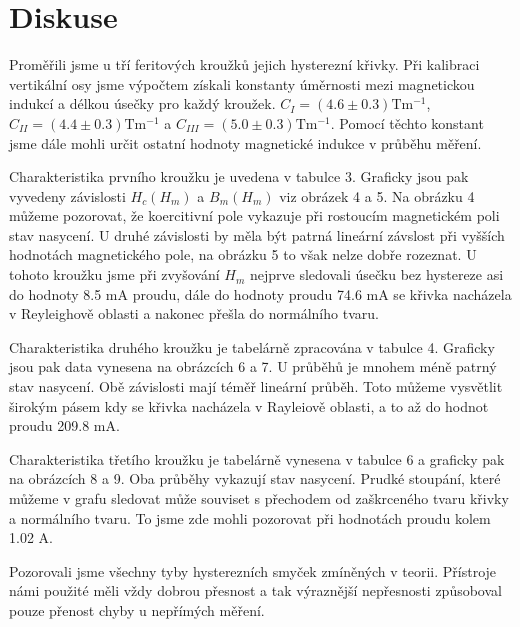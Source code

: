 \documentclass{article}
\begin{document}
\section{Diskuse}
\par  Proměřili jsme u tří feritových kroužků jejich hysterezní křivky. Při kalibraci vertikální osy jsme výpočtem získali konstanty úměrnosti mezi magnetickou indukcí a délkou úsečky pro každý kroužek. $C_{I} = (4.6 \pm 0.3)\mathrm{Tm^{-1}}$, $C_{II} = (4.4 \pm 0.3)\mathrm{Tm^{-1}}$ a $C_{III} = (5.0 \pm 0.3)\mathrm{Tm^{-1}}$. Pomocí těchto konstant jsme dále mohli určit ostatní hodnoty magnetické indukce v průběhu měření. 
\par Charakteristika prvního kroužku je uvedena v tabulce 3. Graficky jsou pak vyvedeny závislosti $H_c(H_m)$ a $B_m(H_m)$ viz obrázek 4 a 5. Na obrázku 4 můžeme pozorovat, že koercitivní pole vykazuje při rostoucím magnetickém poli stav nasycení. U druhé závislosti by měla být patrná lineární závslost při vyšších hodnotách magnetického pole, na obrázku 5 to však nelze dobře rozeznat. U tohoto kroužku jsme při zvyšování $H_m$ nejprve sledovali úsečku bez hystereze asi do hodnoty 8.5 mA proudu, dále do hodnoty proudu 74.6 mA se křivka nacházela v Reyleighově oblasti a nakonec přešla do normálního tvaru.
\par Charakteristika druhého kroužku je tabelárně zpracována v tabulce 4. Graficky jsou pak data vynesena na obrázcích 6 a 7. U průběhů je mnohem méně patrný stav nasycení. Obě závislosti mají téměř lineární průběh. Toto můžeme vysvětlit širokým pásem kdy se křivka nacházela v Rayleiově oblasti, a to až do hodnot proudu 209.8 mA. 
\par Charakteristika třetího kroužku je tabelárně vynesena v tabulce 6 a graficky pak na obrázcích 8 a 9. Oba průběhy vykazují stav nasycení. Prudké stoupání, které můžeme v grafu sledovat může souviset s přechodem od zaškrceného tvaru křivky a normálního tvaru. To jsme zde mohli pozorovat při hodnotách proudu kolem 1.02 A. 
\par Pozorovali jsme všechny tyby hysterezních smyček zmíněných v teorii. Přístroje námi použité měli vždy dobrou přesnost a tak výraznější nepřesnosti způsoboval pouze přenost chyby u nepřímých měření. 
\end{document}
